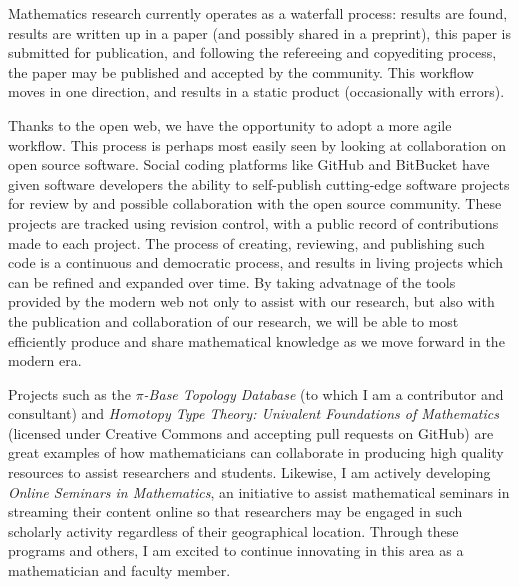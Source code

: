 \documentclass[11pt]{amsart}
\theoremstyle{plain}
\newcommand{\<}{\langle}
\renewcommand{\>}{\rangle}
\begin{document}
Mathematics research currently operates as a waterfall process: results
are found, results are written up in a paper (and possibly shared in a
preprint), this paper is submitted for publication, and following the refereeing
and copyediting process, the paper may be published and accepted by the
community. This workflow moves in one direction, and results in a static
product (occasionally with errors).

Thanks to the open web, we have the opportunity to adopt a more agile
workflow. This process is perhaps most
easily seen by looking at collaboration on open source software.
Social coding platforms like GitHub and BitBucket have given software
developers the ability to self-publish cutting-edge software projects for
review by and possible collaboration with the open source community. These
projects are tracked using revision control, with a public record of
contributions made to each project. The process of creating, reviewing, and
publishing such code is a continuous and democratic process, and results
in living projects which can be refined and expanded over time.
By taking advatnage of the tools provided
by the modern web not only to assist with our research, but also with
the publication and collaboration of our research, we will be able to most
efficiently produce and share mathematical knowledge as we move forward in
the modern era.

Projects such as the \textit{$\pi$-Base Topology Database}
(to which I am a contributor and consultant) and
\textit{Homotopy Type Theory: Univalent Foundations of Mathematics} \cite{hottbook}
(licensed under Creative Commons and accepting pull requests on GitHub)
are great examples of how mathematicians can collaborate in producing
high quality resources to assist researchers and students. Likewise, I
am actively developing \textit{Online Seminars in Mathematics},
an initiative to
assist mathematical seminars in streaming their content online so that
researchers may be engaged in such scholarly activity regardless of their
geographical location.
Through these programs and others,
I am excited to continue innovating in this area
as a mathematician and faculty member.






\end{document}
